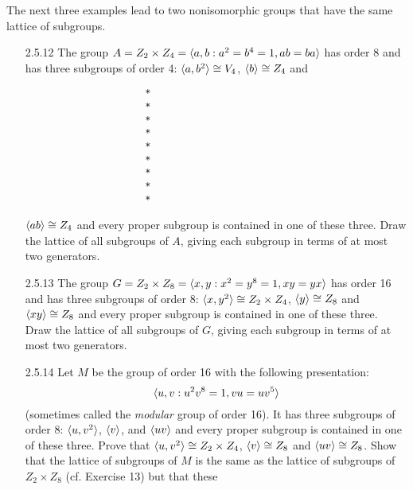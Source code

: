 \noindent The next three examples lead to two nonisomorphic groups that have the 
          same lattice of subgroups.

\begin{enumerate}
   \item[2.5.12]  The group
                  $A = Z_2 \times Z_4 = \langle a, b : a^2 = b^4 = 1, ab = ba \rangle$ has
                  order 8 and has three subgroups of order 4:
                  $\langle a, b^2 \rangle \cong V_4$, $\langle b \rangle \cong Z_4$ and
                  \begin{verbatim}
                     *
                     *
                     *
                     *
                     *
                     *
                     *
                     *
                     *
                  \end{verbatim}
                  $\langle ab \rangle \cong Z_4$ and every proper subgroup is contained in
                  one of these three. Draw the lattice of all subgroups of $A$,
                  giving each subgroup in terms of at most two generators.
   \item[2.5.13]  The group
                  $G = Z_2 \times Z_8 = \langle x, y : x^2 = y^8 = 1, xy = yx \rangle$ has
                  order 16 and has three subgroups of order 8:
                  $\langle x, y^2 \rangle \cong Z_2 \times Z_4$, $\langle y \rangle \cong Z_8$ and
                  $\langle xy \rangle \cong Z_8$ and every proper subgroup is contained in
                  one of these three. Draw the lattice of all subgroups of $G$,
                  giving each subgroup in terms of at most two generators.
   \item[2.5.14]  Let $M$ be the group of order 16 with the following 
                  presentation:
                  $$\langle u, v : u^2 v^8 = 1, vu = uv^5 \rangle$$
                  (sometimes called the \textit{modular} group of order 16). It
                  has three subgroups of order 8: $\langle u, v^2 \rangle$, $\langle v \rangle$, and
                  $\langle uv \rangle$ and every proper subgroup is contained in one of
                  these three. Prove that $\langle u, v^2 \rangle \cong Z_2 \times Z_4$,
                  $\langle v \rangle \cong Z_8$ and $\langle uv \rangle \cong Z_8$. Show that the
                  lattice of subgroups of $M$ is the same as the lattice of
                  subgroups of $Z_2 \times Z_8$ (cf. Exercise 13) but that these

\end{enumerate}
